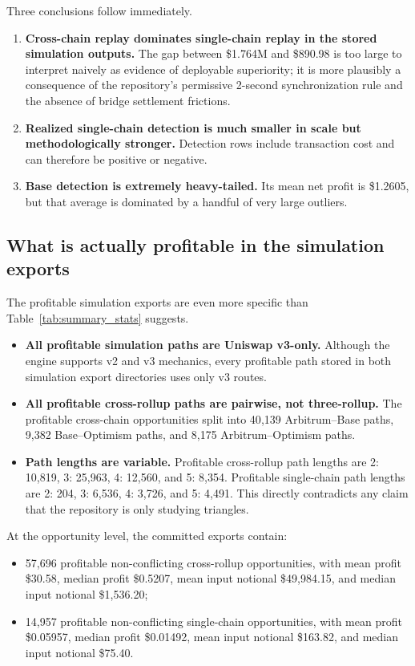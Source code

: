 \documentclass[11pt]{article}
\begin{document}
Three conclusions follow immediately.
\begin{enumerate}[label=\arabic*.]
    \item \textbf{Cross-chain replay dominates single-chain replay in the stored simulation outputs.} The gap between \$1.764M and \$890.98 is too large to interpret naively as evidence of deployable superiority; it is more plausibly a consequence of the repository's permissive 2-second synchronization rule and the absence of bridge settlement frictions.
    \item \textbf{Realized single-chain detection is much smaller in scale but methodologically stronger.} Detection rows include transaction cost and can therefore be positive or negative.
    \item \textbf{Base detection is extremely heavy-tailed.} Its mean net profit is \$1.2605, but that average is dominated by a handful of very large outliers.
\end{enumerate}

\subsection{What is actually profitable in the simulation exports}

The profitable simulation exports are even more specific than Table~\ref{tab:summary_stats} suggests.
\begin{itemize}[leftmargin=1.5em]
    \item \textbf{All profitable simulation paths are Uniswap v3-only.} Although the engine supports v2 and v3 mechanics, every profitable path stored in both simulation export directories uses only v3 routes.
    \item \textbf{All profitable cross-rollup paths are pairwise, not three-rollup.} The profitable cross-chain opportunities split into 40{,}139 Arbitrum--Base paths, 9{,}382 Base--Optimism paths, and 8{,}175 Arbitrum--Optimism paths.
    \item \textbf{Path lengths are variable.} Profitable cross-rollup path lengths are 2: 10{,}819, 3: 25{,}963, 4: 12{,}560, and 5: 8{,}354. Profitable single-chain path lengths are 2: 204, 3: 6{,}536, 4: 3{,}726, and 5: 4{,}491. This directly contradicts any claim that the repository is only studying triangles.
\end{itemize}

At the opportunity level, the committed exports contain:
\begin{itemize}[leftmargin=1.5em]
    \item 57{,}696 profitable non-conflicting cross-rollup opportunities, with mean profit \$30.58, median profit \$0.5207, mean input notional \$49{,}984.15, and median input notional \$1{,}536.20;
    \item 14{,}957 profitable non-conflicting single-chain opportunities, with mean profit \$0.05957, median profit \$0.01492, mean input notional \$163.82, and median input notional \$75.40.
\end{itemize}
\end{document}

